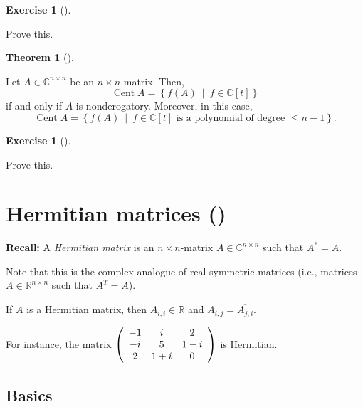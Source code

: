 \documentclass[numbers=enddot,12pt,final,onecolumn,notitlepage]{scrartcl}%
\newcounter{exer}
\numberwithin{exer}{subsection}
\theoremstyle{definition}
\newtheorem{theo}{Theorem}[subsection]
\newenvironment{theorem}[1][]
{\begin{theo}[#1]\begin{leftbar}}
{\end{leftbar}\end{theo}}
\newtheorem{exmp}[exer]{Exercise}
\newenvironment{exercise}[1][]
{\begin{exmp}[#1]\begin{leftbar}}
{\end{leftbar}\end{exmp}}
\begin{document}
\begin{exercise}
 Prove this.
\end{exercise}

\begin{theorem}
\label{thm.jnf.cent.nonderog}Let $A\in\mathbb{C}^{n\times n}$ be an $n\times
n$-matrix. Then,
\[
\operatorname*{Cent}A=\left\{  f\left(  A\right)  \ \mid\ f\in\mathbb{C}%
\left[  t\right]  \right\}
\]
if and only if $A$ is nonderogatory. Moreover, in this case,%
\[
\operatorname*{Cent}A=\left\{  f\left(  A\right)  \ \mid\ f\in\mathbb{C}%
\left[  t\right]  \text{ is a polynomial of degree }\leq n-1\right\}  .
\]

\end{theorem}

\begin{exercise}
 Prove this.
\end{exercise}

\section{Hermitian matrices (\cite[Chapter 4]{HorJoh13})}

\textbf{Recall:} A \emph{Hermitian matrix} is an $n\times n$-matrix
$A\in\mathbb{C}^{n\times n}$ such that $A^{\ast}=A$.

Note that this is the complex analogue of real symmetric matrices (i.e.,
matrices $A\in\mathbb{R}^{n\times n}$ such that $A^{T}=A$).

If $A$ is a Hermitian matrix, then $A_{i,i}\in\mathbb{R}$ and $A_{i,j}%
=\overline{A_{j,i}}$.

For instance, the matrix $\left(
\begin{array}
[c]{ccc}%
-1 & i & 2\\
-i & 5 & 1-i\\
2 & 1+i & 0
\end{array}
\right)  $ is Hermitian.

\subsection{Basics}
\end{document}
